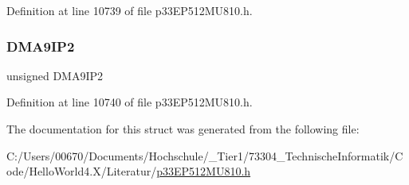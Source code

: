 Definition at line 10739 of file p33\+E\+P512\+M\+U810.\+h.

\mbox{\label{structtag_i_p_c29_b_i_t_s_a794566a7fafe27404abf5caecd46c9f7}} 
\subsubsection{\texorpdfstring{D\+M\+A9\+I\+P2}{DMA9IP2}}
{\footnotesize\ttfamily unsigned D\+M\+A9\+I\+P2}



Definition at line 10740 of file p33\+E\+P512\+M\+U810.\+h.



The documentation for this struct was generated from the following file\+:\begin{DoxyCompactItemize}
\item 
C\+:/\+Users/00670/\+Documents/\+Hochschule/\+\_\+\+Tier1/73304\+\_\+\+Technische\+Informatik/\+Code/\+Hello\+World4.\+X/\+Literatur/\hyperlink{p33_e_p512_m_u810_8h}{p33\+E\+P512\+M\+U810.\+h}\end{DoxyCompactItemize}

